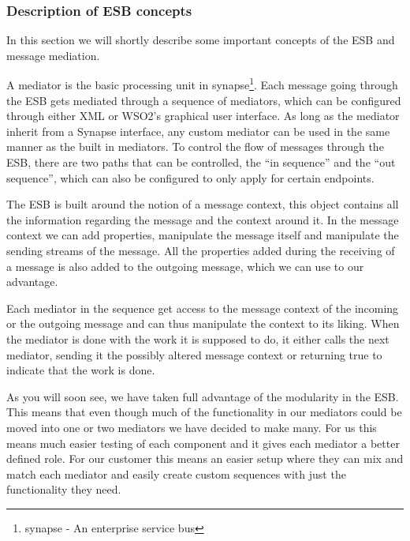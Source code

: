    \subsubsection{Description of ESB concepts}\label{Description of ESB concepts} 

    In this section we will shortly describe some important concepts of the ESB and message mediation.

    A mediator is the basic processing unit in \gls{synapse}\footnote{\gls{synapse} - An enterprise service bus}. Each message going through the ESB gets mediated through a sequence of mediators, which can be configured through either XML or WSO2’s graphical user interface. As long as the mediator inherit from a Synapse interface, any custom mediator can be used in the same manner as the built in mediators. To control the flow of messages through the ESB, there are two paths that can be controlled, the “in sequence” and the “out sequence”, which can also be configured to only apply for certain endpoints.

    The ESB is built around the notion of a message context, this object contains all the information regarding the message and the context around it. In the message context we can add properties, manipulate the message itself and manipulate the sending streams of the message. All the properties added during the receiving of a message is also added to the outgoing message, which we can use to our advantage.

    Each mediator in the sequence get access to the message context of the incoming or the outgoing message and can thus manipulate the context to its liking. When the mediator is done with the work it is supposed to do, it either calls the next mediator, sending it the possibly altered message context or returning true to indicate that the work is done.
    
    As you will soon see, we have taken full advantage of the modularity in the ESB. This means that even though much of the functionality in our mediators could be moved into one or two mediators we have decided to make many. For us this means much easier testing of each component and it gives each mediator a better defined role. For our customer this means an easier setup where they can mix and match each mediator and easily create custom sequences with just the functionality they need.

